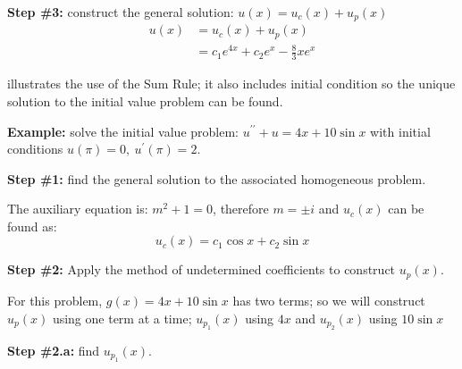 \vspace{0.25cm}
\noindent\textbf{Step \#3:} construct the general solution: $u(x)=u_c(x)+u_p(x)$
\begin{align*}
u(x) &= u_c(x)+u_p(x) \\
&=c_1e^{4x}+c_2e^x - \frac{8}{3}xe^{x}
\end{align*}

 illustrates the use of the Sum Rule; it also includes initial condition so the unique solution to the initial value problem can be found.

\vspace{0.25cm}

\noindent\textbf{Example:} solve the initial value problem: $u^{\prime \prime}+u=4x+10\sin{x}$ with initial conditions $u(\pi)=0, \ u^{\prime}(\pi)=2$.

\vspace{0.25cm}

\noindent\textbf{Step \#1:} find the general solution to the associated homogeneous problem.

\vspace{0.25cm}

\noindent The auxiliary equation is: $m^2+1=0$, therefore $m=\pm i$ and $u_c(x)$ can be found as:
\begin{equation*}
u_c(x) = c_1\cos{x}+c_2\sin{x}
\end{equation*}

\vspace{0.25cm}

\noindent\textbf{Step \#2:} Apply the method of undetermined coefficients to construct $u_p(x)$.

\vspace{0.25cm}

\noindent For this problem, $g(x) = 4x+10\sin{x}$ has two terms; so we will construct $u_p(x)$ using one term at a time; $u_{p_1}(x)$ using $4x$ and $u_{p_2}(x)$ using $10\sin{x}$  

\vspace{0.25cm}

\noindent\textbf{Step \#2.a:} find $u_{p_1}(x)$.

